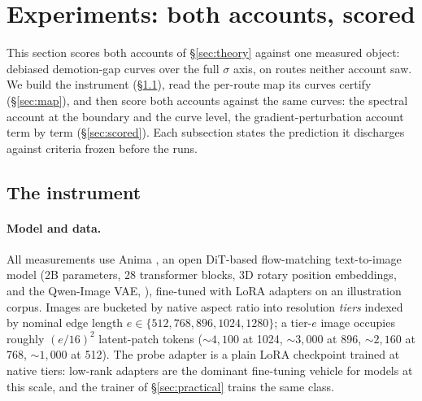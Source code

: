 \section{Experiments: both accounts, scored}
\label{sec:evidence}

This section scores both accounts of \S\ref{sec:theory} against one
measured object: debiased demotion-gap curves over the full $\sigma$
axis, on routes neither account saw. We build the instrument
(\S\ref{sec:instrument}), read the per-route map its curves certify
(\S\ref{sec:map}), and then score both
accounts against the same curves: the spectral account at the
boundary and the curve level, the gradient-perturbation account term
by term (\S\ref{sec:scored}). Each subsection states the prediction
it discharges against criteria frozen before the runs.

\subsection{The instrument}
\label{sec:instrument}

\paragraph{Model and data.}
All measurements use Anima \citep{circlestone2025anima}, an open
DiT-based flow-matching text-to-image model (2B parameters, 28
transformer blocks, 3D rotary position embeddings, and the Qwen-Image
VAE, \citealp{wu2025qwenimage}), fine-tuned with LoRA adapters on an
illustration corpus. Images are bucketed by native aspect ratio into
resolution \emph{tiers} indexed by nominal edge length
$e \in \{512, 768, 896, 1024, 1280\}$; a tier-$e$ image occupies roughly
$(e/16)^2$ latent-patch tokens (${\sim}4{,}100$ at 1024, ${\sim}3{,}000$
at 896, ${\sim}2{,}160$ at 768, ${\sim}1{,}000$ at 512). The probe
adapter is a plain LoRA \citep{hu2022lora} checkpoint trained at
native tiers: low-rank adapters are the dominant fine-tuning vehicle
for models at this scale, and the trainer of \S\ref{sec:practical}
trains the same class.

